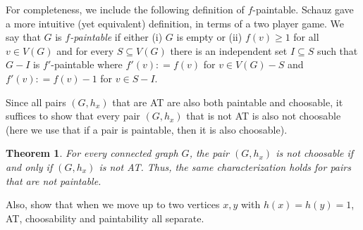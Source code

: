 \documentclass[12pt]{article}
\theoremstyle{plain}
\newtheorem{thm}{Theorem}[section]
\theoremstyle{definition}
\theoremstyle{remark}
\newcommand{\DefinedAs}{\mathrel{\mathop:}=}
\begin{document}
For completeness, we include the following definition of $f$-paintable.
Schauz gave a more intuitive (yet equivalent) definition, in terms of a two
player game.  We say that $G$ is \emph{$f$-paintable} if either (i) $G$ is
empty or (ii) $f(v) \ge 1$ for all $v \in V(G)$ and for every $S \subseteq
V(G)$ there is an independent set $I \subseteq S$ such that $G-I$ is
$f'$-paintable where $f'(v) \DefinedAs f(v)$ for $v \in V(G) - S$ and $f'(v)
\DefinedAs f(v) - 1$ for $v \in S - I$.

Since all pairs $(G,h_x)$ that are AT are also both paintable and choosable, it
suffices to show that every pair $(G,h_x)$ that is not AT is also not choosable
(here we use that if a pair is paintable, then it is also choosable).

\begin{thm}
For every connected graph $G$, the pair $(G,h_x)$ is not choosable if and only
if $(G,h_x)$ is not AT.  Thus, the same characterization holds for pairs that
are not paintable.
\end{thm}

Also, show that when we move up to two vertices $x,y$ with $h(x) =
h(y) = 1$, AT, choosability and paintability all
separate.




\end{document}
